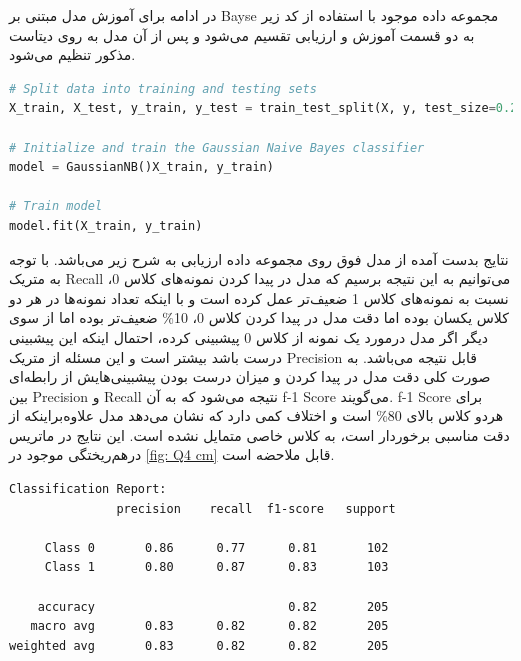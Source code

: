 \documentclass{article}
\begin{document}
در ادامه برای آموزش مدل مبتنی بر
Bayse
مجموعه داده موجود با استفاده از کد زیر به دو قسمت آموزش و ارزیابی تقسیم می‌شود و پس از آن مدل به روی دیتاست مذکور تنظیم می‌شود.

\begin{LTR}
\begin{lstlisting}[language=Python, caption=best alpha]
# Split data into training and testing sets
X_train, X_test, y_train, y_test = train_test_split(X, y, test_size=0.2, random_state=53)

# Initialize and train the Gaussian Naive Bayes classifier
model = GaussianNB()X_train, y_train)

# Train model
model.fit(X_train, y_train)
\end{lstlisting}
\end{LTR}

نتایج بدست آمده از مدل فوق روی مجموعه داده ارزیابی به شرح زیر می‌باشد. با توجه به متریک 
Recall
می‌توانیم به این نتیجه برسیم که مدل در پیدا کردن نمونه‌های کلاس 0، نسبت به نمونه‌های کلاس 1 ضعیف‌تر عمل کرده است و با اینکه تعداد نمونه‌ها در هر دو کلاس یکسان بوده اما دقت مدل در پیدا کردن کلاس 0، 
10\%
ضعیف‌تر بوده اما از سوی دیگر اگر مدل درمورد یک نمونه از کلاس 0 پیشبینی کرده، احتمال اینکه این پیشبینی درست باشد بیشتر است و این مسئله از متریک 
Precision
قابل نتیجه می‌باشد. به صورت کلی دقت مدل در پیدا کردن و میزان درست بودن پیشبینی‌هایش از رابطه‌ای بین 
Precision و Recall 
نتیجه می‌شود که به آن 
f-1 Score
می‌گویند. 
f-1 Score 
برای هردو کلاس بالای 
80\% 
است و اختلاف کمی دارد که نشان می‌دهد مدل علاوه‌براینکه از دقت مناسبی برخوردار است، به کلاس خاصی متمایل نشده است. این نتایج در ماتریس درهم‌ریختگی موجود در 
\autoref{fig: Q4 cm}
قابل ملاحضه است.
\begin{LTR}
\begin{verbatim}
Classification Report:
               precision    recall  f1-score   support

     Class 0       0.86      0.77      0.81       102
     Class 1       0.80      0.87      0.83       103

    accuracy                           0.82       205
   macro avg       0.83      0.82      0.82       205
weighted avg       0.83      0.82      0.82       205
\end{verbatim}
\end{LTR}
\end{document}
